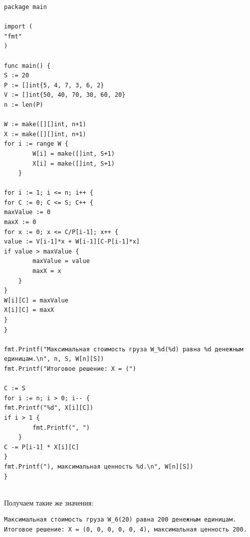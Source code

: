 \documentclass{article}
\begin{document}
\begin{verbatim}
package main

import (
"fmt"
)

func main() {
S := 20
P := []int{5, 4, 7, 3, 6, 2}
V := []int{50, 40, 70, 30, 60, 20}
n := len(P)

W := make([][]int, n+1)
X := make([][]int, n+1)
for i := range W {
        W[i] = make([]int, S+1)
        X[i] = make([]int, S+1)
    }

for i := 1; i <= n; i++ {
for C := 0; C <= S; C++ {
maxValue := 0
maxX := 0
for x := 0; x <= C/P[i-1]; x++ {
value := V[i-1]*x + W[i-1][C-P[i-1]*x]
if value > maxValue {
        maxValue = value
        maxX = x
    }
}
W[i][C] = maxValue
X[i][C] = maxX
}
}

fmt.Printf("Максимальная стоимость груза W_%d(%d) равна %d денежным единицам.\n", n, S, W[n][S])
fmt.Printf("Итоговое решение: X = (")

C := S
for i := n; i > 0; i-- {
fmt.Printf("%d", X[i][C])
if i > 1 {
        fmt.Printf(", ")
    }
C -= P[i-1] * X[i][C]
}
fmt.Printf("), максимальная ценность %d.\n", W[n][S])
}
\end{verbatim}\\
Получаем такие же значения:
\begin{verbatim}
Максимальная стоимость груза W_6(20) равна 200 денежным единицам.
Итоговое решение: X = (0, 0, 0, 0, 0, 4), максимальная ценность 200.
\end{verbatim}\\
\end{document}

